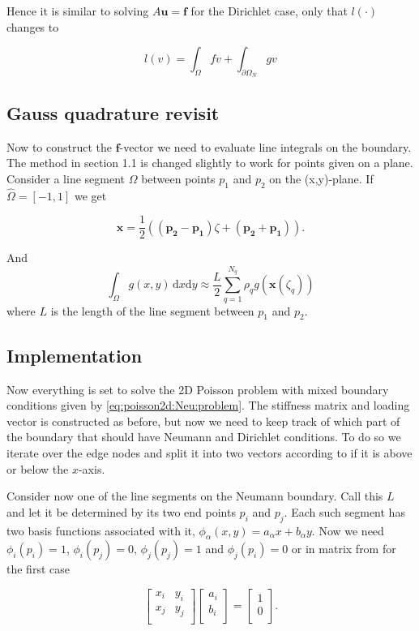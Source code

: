 \documentclass[paper=a4, fontsize=11pt]{scrartcl} %
\begin{document}
Hence it is similar to solving $A\mathbf{u}=\mathbf{f}$ for the Dirichlet case, only that $l(\cdot)$ changes to

\begin{equation}
l(v)=\int_{\Omega} f v  +  \int_{\partial\Omega_N} \! g v
\label{eq:poisson2d:l}
\end{equation}
\subsection{Gauss quadrature revisit}
Now to construct the $\mathbf{f}$-vector we need to evaluate line integrals on the boundary. The method in section 1.1 is changed slightly to work for points given on a plane. Consider a line segment $\Omega$ between points $p_1$ and $p_2$ on the (x,y)-plane. If $\hat{\Omega}=[-1,1]$ we get

\[ \mathbf{x}=\frac{1}{2} \left((\mathbf{p_2}-\mathbf{p_1}) \zeta +(\mathbf{p_2}+\mathbf{p_1})\right).\]

And 
\[ \int_{\Omega} \! g(x,y) \, \mathrm{d}x\mathrm{d}y \approx \frac{L}{2}\sum_{q=1}^{N_q} \rho_{q}g(\mathbf{x}(\zeta_q))
\]
where $L$ is the length of the line segment between $p_1$ and $p_2$.
\subsection{Implementation}
Now everything is set to solve the 2D Poisson problem with mixed boundary conditions given by \eqref{eq:poisson2d:Neu:problem}.
The stiffness matrix and loading vector is constructed as before, but now we need to keep track of which part of the boundary that should have Neumann and Dirichlet conditions. To do so we iterate over the edge nodes and split it into two vectors according to if it is above or below the $x$-axis.

Consider now one of the line segments on the Neumann boundary. Call this $L$ and let it be determined by its two end points $p_i$ and $p_j$. Each such segment has two basis functions associated with it, $\phi_{\alpha}(x,y)=a_{\alpha}x+b_{\alpha}y$. Now we need $\phi_{i}(p_i)=1$, $\phi_{i}(p_j)=0$, $\phi_{j}(p_j)=1$ and $\phi_{j}(p_i)=0$ or in matrix from for the first case

\[\begin{bmatrix}
  x_i & y_i\\
  x_j & y_j\\
 \end{bmatrix}
\begin{bmatrix} a_i \\ b_i\\ \end{bmatrix} =
\begin{bmatrix}
  1 \\ 0\\ 
\end{bmatrix}.\]
\end{document}
